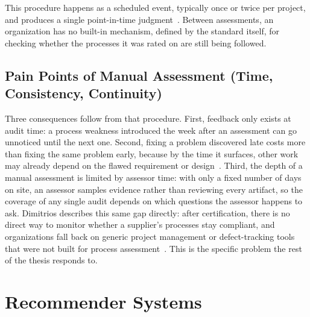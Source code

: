 \documentclass[a4paper, 12pt, oneside, openany, BCOR1cm,toc=chapterentrywithdots]{scrbook}
\begin{document}
This procedure happens as a scheduled event, typically once or twice per project, and produces a
single point-in-time judgment~\cite{vdaqmc2023pam,murphy_aspice_0to60}. Between assessments, an
organization has no built-in mechanism, defined by the standard itself, for checking whether the
processes it was rated on are still being followed.


\subsection{Pain Points of Manual Assessment (Time, Consistency, Continuity)}

Three consequences follow from that procedure. First, feedback only exists at audit time: a
process weakness introduced the week after an assessment can go unnoticed until the next one.
Second, fixing a problem discovered late costs more than fixing the same problem early, because by
the time it surfaces, other work may already depend on the flawed
requirement or design~\cite{schauffele2016automotive,jiang2013earlylifecycle}. Third, the
depth of a manual assessment is limited by assessor time: with only a fixed number of days on
site, an assessor samples evidence rather than reviewing every artifact, so the coverage of any
single audit depends on which questions the assessor happens to ask. Dimitrios describes this
same gap directly: after certification, there is no direct way to monitor
whether a supplier's processes stay compliant, and organizations fall back on generic project
management or defect-tracking tools that were not built for process
assessment~\cite{datsogiannis2024early}. This is the specific problem the rest of the thesis
responds to.


\section{Recommender Systems}
\end{document}

